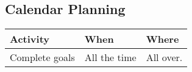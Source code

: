 \subsection{Calendar Planning}

\begin{table}
    \centering
    \begin{tabular}{l|l|l}
        \rowcolor{Gray}
        \textbf{Activity} & \textbf{When} & \textbf{Where}\\\hline
         Complete goals   & All the time  & All over.
    \end{tabular}
    \label{tab:planning}
\end{table}
